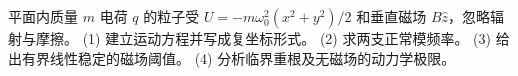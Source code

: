 平面内质量 $m$ 电荷 $q$ 的粒子受 $U=-m\omega_0^2(x^2+y^2)/2$ 和垂直磁场 $B\hat z$，忽略辐射与摩擦。
(1) 建立运动方程并写成复坐标形式。
(2) 求两支正常模频率。
(3) 给出有界线性稳定的磁场阈值。
(4) 分析临界重根及无磁场的动力学极限。
